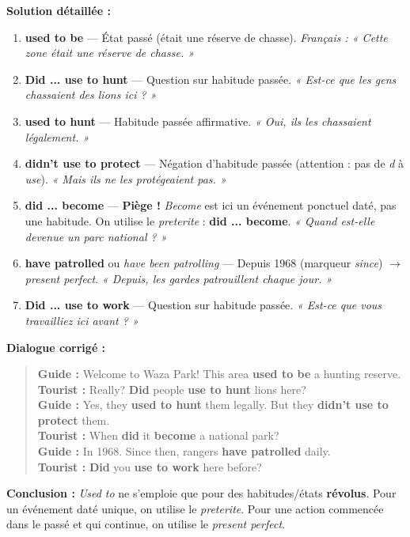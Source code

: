 \documentclass[11pt]{article}
\begin{document}
\begin{exoresolu}
\tcblower
\textbf{Solution détaillée :}
\begin{enumerate}
    \item \textbf{used to be} — État passé (était une réserve de chasse). \textit{Français : « Cette zone était une réserve de chasse. »}
    \item \textbf{Did ... use to hunt} — Question sur habitude passée. \textit{« Est-ce que les gens chassaient des lions ici ? »}
    \item \textbf{used to hunt} — Habitude passée affirmative. \textit{« Oui, ils les chassaient légalement. »}
    \item \textbf{didn't use to protect} — Négation d'habitude passée (attention : pas de \emph{d} à \emph{use}). \textit{« Mais ils ne les protégeaient pas. »}
    \item \textbf{did ... become} — \textbf{Piège !} \emph{Become} est ici un événement ponctuel daté, pas une habitude. On utilise le \emph{preterite} : \textbf{did ... become}. \textit{« Quand est-elle devenue un parc national ? »}
    \item \textbf{have patrolled} ou \emph{have been patrolling} — Depuis 1968 (marqueur \emph{since}) $\rightarrow$ \emph{present perfect}. \textit{« Depuis, les gardes patrouillent chaque jour. »}
    \item \textbf{Did ... use to work} — Question sur habitude passée. \textit{« Est-ce que vous travailliez ici avant ? »}
\end{enumerate}
\textbf{Dialogue corrigé :}
\begin{quote}
\textbf{Guide :} Welcome to Waza Park! This area \textbf{used to be} a hunting reserve. \\
\textbf{Tourist :} Really? \textbf{Did} people \textbf{use to hunt} lions here? \\
\textbf{Guide :} Yes, they \textbf{used to hunt} them legally. But they \textbf{didn't use to protect} them. \\
\textbf{Tourist :} When \textbf{did} it \textbf{become} a national park? \\
\textbf{Guide :} In 1968. Since then, rangers \textbf{have patrolled} daily. \\
\textbf{Tourist :} \textbf{Did} you \textbf{use to work} here before?
\end{quote}
\textbf{Conclusion :} \emph{Used to} ne s'emploie que pour des habitudes/états \textbf{révolus}. Pour un événement daté unique, on utilise le \emph{preterite}. Pour une action commencée dans le passé et qui continue, on utilise le \emph{present perfect}.
\end{exoresolu}
\end{document}
